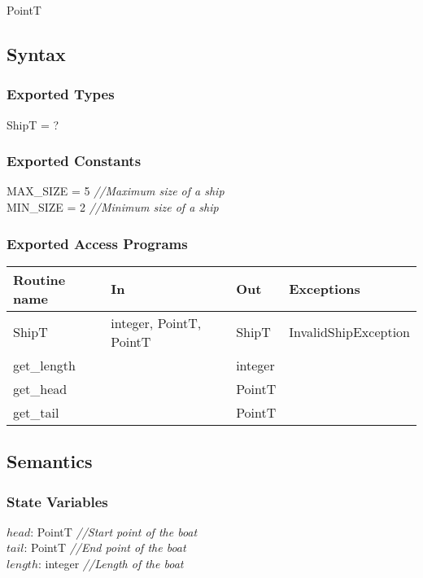 \documentclass[12pt]{article}
\begin{document}
PointT

\subsection* {Syntax}

\subsubsection* {Exported Types}

ShipT = ?

\subsubsection* {Exported Constants }

MAX\_SIZE =  5 {\it //Maximum size of a ship}\\
\newline
MIN\_SIZE = 2 {\it //Minimum size of a ship}\\


\subsubsection* {Exported Access Programs}

\begin{tabular}{| l | l | l | l |}
\hline
\textbf{Routine name} & \textbf{In} & \textbf{Out} & \textbf{Exceptions}\\
\hline
ShipT & integer, PointT, PointT & ShipT & InvalidShipException \\
\hline
get\_length &   &  integer  & \\
\hline 
get\_head & & PointT &  \\
\hline
get\_tail &  &  PointT & \\
\hline
\end{tabular}

\subsection* {Semantics}

\subsubsection* {State Variables}

$\mathit{head}$: PointT {\it //Start point of the boat}\\
$\mathit{tail}$: PointT {\it //End point of the boat}\\
$\mathit{length}$: integer {\it //Length of the boat}
\end{document}
